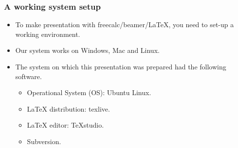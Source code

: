 \begin{frame}
\frametitle{A working system setup}
\begin{itemize}
\item To make presentation with freecalc/beamer/\LaTeX, you need to set-up a working environment.
\item Our system works on Windows, Mac and Linux. 
\item The system on which this presentation was prepared had the following software.
\begin{itemize}
\item Operational System (OS): Ubuntu Linux.
\item \LaTeX{} distribution: texlive.
\item \LaTeX{} editor: TeXstudio.
\item Subversion.
\end{itemize}
\end{itemize}
\end{frame}